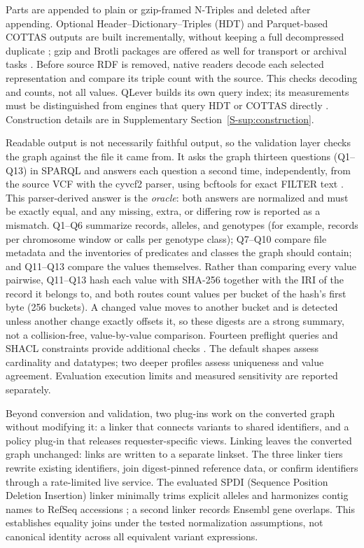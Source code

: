 \documentclass[pdflatex,sn-mathphys-num]{sn-jnl}
\begin{document}
Parts are appended to plain or gzip-framed N-Triples and deleted after appending. 
Optional Header--Dictionary--Triples (HDT) and Parquet-based COTTAS outputs are built incrementally, without keeping a full decompressed duplicate \cite{hdt_2013,cottas_2025}; gzip and Brotli packages are offered as well for transport or archival tasks \cite{brotli_2019}. 
Before source RDF is removed, native readers decode each selected representation and compare its triple count with the source. 
This checks decoding and counts, not all values. 
QLever builds its own query index; its measurements must be distinguished from engines that query HDT or COTTAS directly \cite{qlever_2017,Taelman2018Comunica,comunica_cottas_2026}. 
Construction details are in Supplementary Section~\ref{S-sup:construction}.

Readable output is not necessarily faithful output, so the validation layer checks the graph against the file it came from. 
It asks the graph thirteen questions (Q1--Q13) in SPARQL and answers each question a second time, independently, from the source VCF with the cyvcf2 parser, using bcftools for exact FILTER text \cite{vcf_intro,cyvcf2_2017,BCFtools}. 
This parser-derived answer is the \emph{oracle}: both answers are normalized and must be exactly equal, and any missing, extra, or differing row is reported as a mismatch. 
Q1--Q6 summarize records, alleles, and genotypes (for example, records per chromosome window or calls per genotype class); Q7--Q10 compare file metadata and the inventories of predicates and classes the graph should contain; and Q11--Q13 compare the values themselves. 
Rather than comparing every value pairwise, Q11--Q13 hash each value with SHA-256 together with the IRI of the record it belongs to, and both routes count values per bucket of the hash's first byte (256 buckets). 
A changed value moves to another bucket and is detected unless another change exactly offsets it, so these digests are a strong summary, not a collision-free, value-by-value comparison. 
Fourteen preflight queries and SHACL constraints provide additional checks \cite{shacl2017}. 
The default shapes assess cardinality and datatypes; two deeper profiles assess uniqueness and value agreement. 
Evaluation execution limits and measured sensitivity are reported separately.

Beyond conversion and validation, two plug-ins work on the converted graph without modifying it: a linker that connects variants to shared identifiers, and a policy plug-in that releases requester-specific views. 
Linking leaves the converted graph unchanged: links are written to a separate linkset. 
The three linker tiers rewrite existing identifiers, join digest-pinned reference data, or confirm identifiers through a rate-limited live service. 
The evaluated SPDI (Sequence Position Deletion Insertion) linker minimally trims explicit alleles and harmonizes contig names to RefSeq accessions \cite{holmes2020spdi}; a second linker records Ensembl gene overlaps. 
This establishes equality joins under the tested normalization assumptions, not canonical identity across all equivalent variant expressions.
\end{document}

